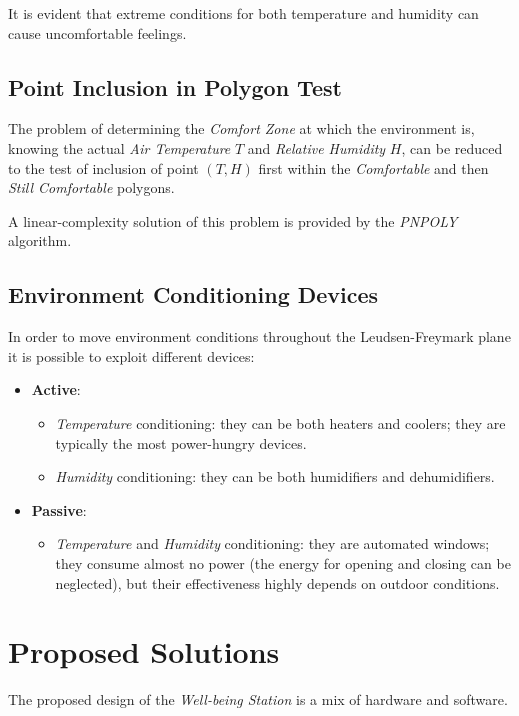 \documentclass[peerreview]{IEEEtran}
\begin{document}
It is evident that extreme conditions for both temperature and humidity can
cause uncomfortable feelings.

\subsection{Point Inclusion in Polygon Test}
The problem of determining the \emph{Comfort Zone} at which the environment is,
knowing the actual \emph{Air Temperature} $T$ and \emph{Relative Humidity} $H$,
can be reduced to the test of inclusion of point $(T,H)$ first within the
\emph{Comfortable} and then \emph{Still Comfortable} polygons.

A linear-complexity solution of this problem is provided by the
\emph{PNPOLY}~\cite{pnpoly_2021} algorithm.

\subsection{Environment Conditioning Devices}
In order to move environment conditions throughout the Leudsen-Freymark plane
it is possible to exploit different devices:
\begin{itemize}
	\item \textbf{Active}:
		\begin{itemize}
			\item \emph{Temperature} conditioning: they can be both
				heaters and coolers; they are typically the
				most power-hungry devices.
			\item \emph{Humidity} conditioning: they can be both
				humidifiers and dehumidifiers.
		\end{itemize}
	\item \textbf{Passive}:
		\begin{itemize}
			\item \emph{Temperature} and \emph{Humidity} conditioning:
				they are automated windows; they consume almost
				no power (the energy for opening and closing can
				be neglected), but their effectiveness highly
				depends on outdoor conditions.
		\end{itemize}
\end{itemize}

\section{Proposed Solutions}
The proposed design of the \emph{Well-being Station} is a mix of hardware and software.
\end{document}
